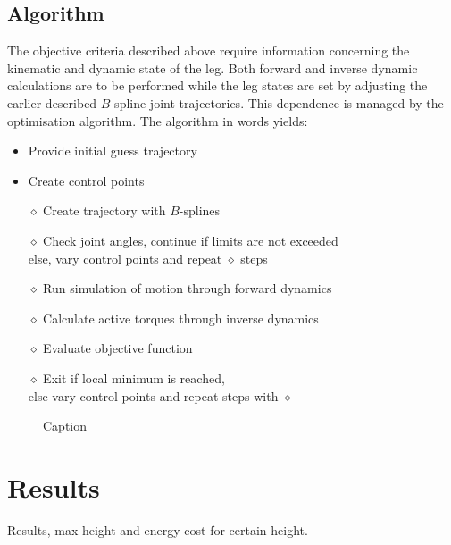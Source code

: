 \documentclass[letterpaper, 10 pt, conference]{ieeeconf}  %
\begin{document}
\subsection{Algorithm}

The objective criteria described above require information concerning the kinematic and dynamic state of the leg. Both forward and inverse dynamic calculations are to be performed while the leg states are set by adjusting the earlier described $B$-spline joint trajectories. This dependence is managed by the optimisation algorithm. The algorithm in words yields:\\

\begin{itemize}
	\item Provide initial guess trajectory
	\item Create control points\\
	\item[$\diamond$] Create trajectory with $B$-splines
	\item[$\diamond$] Check joint angles, continue if limits are not exceeded \\else, vary control points and repeat $\diamond$ steps
	\item[$\diamond$] Run simulation of motion through forward dynamics
	\item[$\diamond$] Calculate active torques through inverse dynamics
	\item[$\diamond$] Evaluate objective function\\
	\item[$\diamond$] Exit if local minimum is reached, \\ else vary control points and repeat steps with $\diamond$ 
\end{itemize}

	





   \begin{figure}[thpb]
      \centering
      \caption{Caption}
      \label{figurelabel}
   \end{figure}
   
\section{Results}

Results, max height and energy cost for certain height.\\
\end{document}
